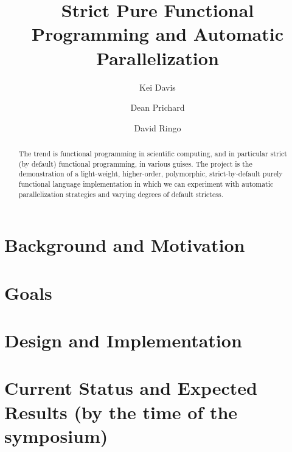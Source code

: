 \documentclass{llncs}
\begin{document}
%
%
\pagestyle{headings}  %
%
%
\title{Strict Pure Functional Programming and Automatic Parallelization}
%
%
\author{Kei Davis \and Dean Prichard \and David Ringo}
%
%
%

\maketitle              %

\begin{abstract}
The trend is functional programming in scientific computing, and in particular
strict (by default) functional programming, in various guises.  The project is
the demonstration of a light-weight, higher-order, polymorphic,
strict-by-default purely functional language implementation in which we can
experiment with automatic parallelization strategies and varying degrees of
default strictess.


\end{abstract}

\section{Background and Motivation}

\section{Goals}

\section{Design and Implementation}

\section{Current Status and Expected Results (by the time of the symposium)}


%
%
\begin{thebibliography}{5}

\end{thebibliography}
\end{document}
